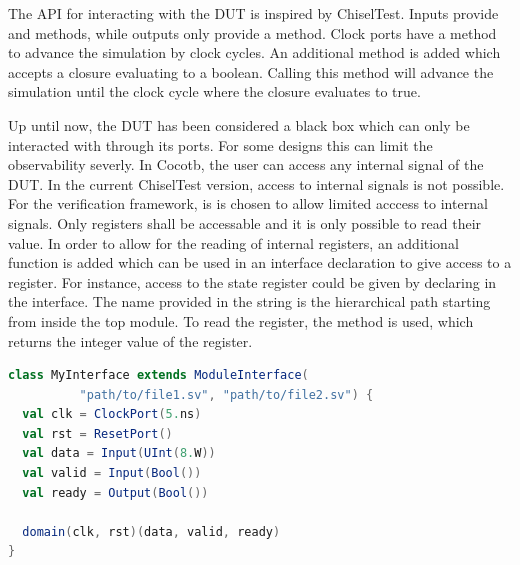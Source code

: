 The API for interacting with the DUT is inspired by ChiselTest. Inputs provide  and  methods,
while outputs only provide a  method. Clock ports have a  method to advance the simulation by
 clock cycles. An additional method  is added which accepts a closure evaluating to a boolean. Calling this method will advance the simulation until the clock cycle where the closure evaluates to true. 



Up until now, the DUT has been considered a black box which can only be interacted with through its ports. For some designs this can limit the observability severly. In Cocotb, the user can access any internal signal of the DUT. In the current ChiselTest version, access to internal signals is not possible. For the verification framework, is is chosen to allow limited acccess to internal signals. Only registers shall be accessable and it is only possible to read their value. In order to allow for the reading of internal registers, an additional function is added which can be used in an interface declaration to give access to a register. For instance, access to the state register could be given by declaring  in the interface. The name provided in the string is the hierarchical path starting from inside the top module. To read the register, the  method is used, which returns the integer value of the register.


\begin{listing}
\begin{lstlisting}[language=scala, captionpos=b, caption=Example for an interface declaration in Scala. Each data signal is assocaited with a clock domain.,label=lst:interface]
class MyInterface extends ModuleInterface(
          "path/to/file1.sv", "path/to/file2.sv") {
  val clk = ClockPort(5.ns)
  val rst = ResetPort()
  val data = Input(UInt(8.W))
  val valid = Input(Bool())
  val ready = Output(Bool())

  domain(clk, rst)(data, valid, ready)
}
\end{lstlisting}
\end{listing}

